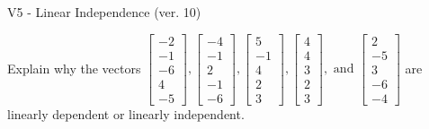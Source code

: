 \begin{exercise}
  \begin{exerciseTitle}V5 - Linear Independence (ver. 10)\end{exerciseTitle}
  \begin{exerciseStatement}
    Explain why the vectors \(\left[\begin{array}{r}
-2 \\
-1 \\
-6 \\
4 \\
-5
\end{array}\right] , \left[\begin{array}{r}
-4 \\
-1 \\
2 \\
-1 \\
-6
\end{array}\right] , \left[\begin{array}{r}
5 \\
-1 \\
4 \\
2 \\
3
\end{array}\right] , \left[\begin{array}{r}
4 \\
4 \\
3 \\
2 \\
3
\end{array}\right] , \text{ and } \left[\begin{array}{r}
2 \\
-5 \\
3 \\
-6 \\
-4
\end{array}\right]\) are linearly dependent or linearly independent.	



\end{exerciseStatement}
\end{exercise}
